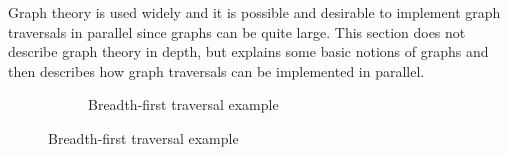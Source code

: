 Graph theory is used widely and it is possible and desirable to implement graph traversals in parallel since graphs can be quite large.
This section does not describe graph theory in depth, but explains some basic notions of graphs and then describes how graph traversals can be implemented in parallel.
\begin{figure}
	\begin{subfigure}[b]{0.3\textwidth}
		\begin{center}
		\end{center}
		\caption{Breadth-first traversal example}
		\label{fig:bfs}
	\end{subfigure}
	

\end{figure}
